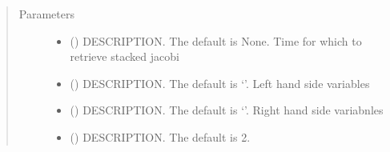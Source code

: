 \documentclass[letterpaper,10pt,english]{sphinxmanual}
\begin{document}
\begin{fulllineitems}
\begin{fulllineitems}
\end{fulllineitems}


\begin{fulllineitems}
\label{\detokenize{index:modelnewton.newton_diff.show_stacked_diff}}
\pysigstartsignatures
{}
\pysigstopsignatures\begin{quote}\begin{description}
\item[{Parameters}] \leavevmode\begin{itemize}
\item {} 
\sphinxAtStartPar
{} (\sphinxstyleliteralemphasis{\sphinxupquote{, }}) \textendash{} DESCRIPTION. The default is None. Time for which to retrieve stacked jacobi

\item {} 
\sphinxAtStartPar
{} (\sphinxstyleliteralemphasis{\sphinxupquote{, }}) \textendash{} DESCRIPTION. The default is ‘’. Left hand side variables

\item {} 
\sphinxAtStartPar
{} (\sphinxstyleliteralemphasis{\sphinxupquote{, }}) \textendash{} DESCRIPTION. The default is ‘’. Right hand side variabnles

\item {} 
\sphinxAtStartPar
{} (\sphinxstyleliteralemphasis{\sphinxupquote{, }}) \textendash{} DESCRIPTION. The default is 2.


\end{itemize}
\end{description}
\end{quote}
\end{fulllineitems}
\end{fulllineitems}
\end{document}
